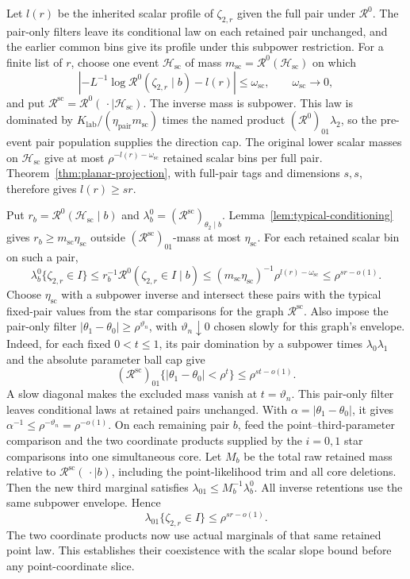 Let $l(r)$ be the inherited scalar profile of $\zeta_{2,r}$ given the
full pair under $\mathcal R^0$.  The pair-only filters leave its
conditional law on each retained pair unchanged, and the earlier
common bins give its profile under this subpower restriction.
For a finite list of $r$, choose one event $\mathcal H_{\mathrm{sc}}$
of mass $m_{\mathrm{sc}}=\mathcal R^0(\mathcal H_{\mathrm{sc}})$ on which
\[
 \left|-L^{-1}\log\mathcal R^0(\zeta_{2,r}\mid b)-l(r)\right|
       \le\omega_{\mathrm{sc}},\qquad \omega_{\mathrm{sc}}\to0,
\]
and put $\mathcal R^{\mathrm{sc}}
=\mathcal R^0(\,\cdot\mid\mathcal H_{\mathrm{sc}})$.
The inverse mass is subpower.  This law is dominated by
$K_{\mathrm{lab}}/(\eta_{\mathrm{pair}}m_{\mathrm{sc}})$ times the
named product $(\mathcal R^0)_{01}\lambda_2$, so the pre-event pair
population supplies the direction cap.  The original lower scalar
masses on $\mathcal H_{\mathrm{sc}}$ give at most
$\rho^{-l(r)-\omega_{\mathrm{sc}}}$ retained scalar bins per full pair.
Theorem~\ref{thm:planar-projection}, with full-pair tags and dimensions
$s,s$, therefore gives $l(r)\ge sr$.

Put $r_b=\mathcal R^0(\mathcal H_{\mathrm{sc}}\mid b)$ and
$\lambda_b^0=(\mathcal R^{\mathrm{sc}})_{\theta_2\mid b}$.
Lemma~\ref{lem:typical-conditioning} gives
$r_b\ge m_{\mathrm{sc}}\eta_{\mathrm{sc}}$ outside
$(\mathcal R^{\mathrm{sc}})_{01}$-mass at most $\eta_{\mathrm{sc}}$.
For each retained scalar bin on such a pair,
\[
 \lambda_b^0\{\zeta_{2,r}\in I\}
 \le r_b^{-1}\mathcal R^0(\zeta_{2,r}\in I\mid b)
 \le(m_{\mathrm{sc}}\eta_{\mathrm{sc}})^{-1}
       \rho^{l(r)-\omega_{\mathrm{sc}}}
 \le\rho^{sr-o(1)}.
\]
Choose $\eta_{\mathrm{sc}}$ with a subpower inverse and intersect these
pairs with the typical fixed-pair values from the star comparisons for
the graph $\mathcal R^{\mathrm{sc}}$.  Also impose the pair-only filter
$|\theta_1-\theta_0|\ge\rho^{\vartheta_n}$, with
$\vartheta_n\downarrow0$ chosen slowly for this graph's envelope.
Indeed, for each fixed $0<t\le1$, its pair domination by a subpower times
$\lambda_0\lambda_1$ and the absolute parameter ball cap give
\[
 (\mathcal R^{\mathrm{sc}})_{01}
       \{|\theta_1-\theta_0|<\rho^t\}
 \le\rho^{st-o(1)}.
\]
A slow diagonal makes the excluded mass vanish at $t=\vartheta_n$.
This pair-only filter leaves conditional laws at retained pairs unchanged.
With $\alpha=|\theta_1-\theta_0|$, it gives
$\alpha^{-1}\le\rho^{-\vartheta_n}=\rho^{-o(1)}$.
On each remaining pair $b$, feed the
point--third-parameter comparison and the two coordinate products
supplied by the $i=0,1$ star comparisons into one simultaneous core.
Let $M_b$ be the total raw retained mass relative to
$\mathcal R^{\mathrm{sc}}(\,\cdot\mid b)$, including the point-likelihood
trim and all core deletions.  Then the new third marginal satisfies
$\lambda_{01}\le M_b^{-1}\lambda_b^0$.  All inverse retentions use the
same subpower envelope.  Hence
\begin{equation}\label{eq:rate-third-slope}
 \lambda_{01}\{\zeta_{2,r}\in I\}\le\rho^{sr-o(1)}.
\end{equation}
The two coordinate products now use actual marginals of that same
retained point law.  This establishes their coexistence with the scalar
slope bound before any point-coordinate slice.


